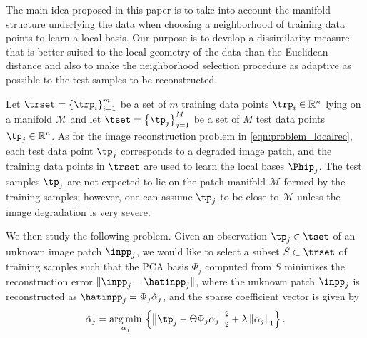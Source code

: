 \documentclass[journal]{IEEEtran}
\begin{document}
The main idea proposed in this paper is to take into account the manifold structure underlying the data when choosing a neighborhood of training data points to learn a local basis. Our purpose is to develop a dissimilarity measure that is better suited to the local geometry of the data than the Euclidean distance and also to make the neighborhood selection procedure as adaptive as possible to the test samples to be reconstructed. 





Let $	\trset= \left\{\trp_i  \right\}_{i=1}^{m}$ be a set of $m$ training data points $\trp_i \in \mathbb{R}^n$ lying on a manifold $\mathcal{M}$ and let $	\tset =   \left\{\tp_j \right\}_{j=1}^{M}$ be a set of $M$ test data points $\tp_j \in\mathbb{R}^n $. As for the image reconstruction problem in \eqref{eqn:problem_localrec}, each test data point $\tp_j$ corresponds to a degraded image patch, and the training data points in $\trset$ are used to learn the local bases $\Phip_j$. The test samples $\tp_j$ are not expected to lie on the  patch manifold $\mathcal{M}$ formed by the training samples; however, one can assume $\tp_j$ to be close to $\mathcal{M}$ unless the image degradation is very severe.

We then study the following problem. Given an observation $\tp_j \in \tset$ of an unknown image patch $\inpp_j$, we would like to select a subset $S \subset \trset$ of training samples such that the PCA basis $\Phi_j$ computed from $S $ minimizes the reconstruction error $\|  \inpp_j - \hatinpp_j \|$, where  the unknown patch $ \inpp_j$ is reconstructed as  $\hatinpp_j = \Phi_j \hat{\alpha}_j$, and  the sparse coefficient vector is given by
%
\begin{equation}
	\hat{\alpha}_j=\underset{\alpha_j}{\operatorname{arg\,min}} \, \left\{ \left\|  \tp_j -\Theta \Phi_j \alpha_j \right\|_{2}^{2} + \lambda \left\| \alpha_j \right\|_1\right\}.
\end{equation}
%
\end{document}
